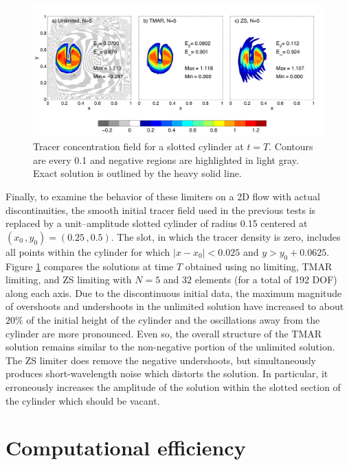 \documentclass{ametsoc}
\begin{document}
\begin{figure} 
\includegraphics[width=\textwidth]{figs/2d/defCyl_3panel.pdf}
\caption{Tracer concentration field for a slotted cylinder at $t=T$. Contours are every 0.1 and negative regions are highlighted in light gray. Exact solution is outlined by the heavy solid line.}\label{fig:2dCyl}
\end{figure}

Finally, to examine the behavior of these limiters on a 2D flow with actual discontinuities,  the smooth initial tracer field used in the previous tests is replaced by a unit--amplitude slotted cylinder of radius 0.15 centered at $(x_0\, , y_0) = (0.25\,,0.5)$.  The slot, in which the tracer density is zero, includes all points within the cylinder for which $|x-x_0| < 0.025$ and  $y > y_0 + 0.0625$.  Figure \ref{fig:2dCyl} compares the solutions at time $T$ obtained using no limiting, TMAR limiting, and ZS limiting with $N=5$ and $32$ elements (for a total of 192 DOF) along each axis. Due to the discontinuous initial data, the maximum magnitude of overshoots and undershoots in the unlimited solution have increased to about $20\%$ of the initial height of the cylinder and the oscillations away from the cylinder are more pronounced. Even so, the overall structure of the TMAR solution remains similar to the non-negative portion of the unlimited solution. The ZS limiter does remove the negative undershoots, but simultaneously produces short-wavelength noise which distorts the solution. In particular, it erroneously increases the amplitude of the solution within the slotted section of the cylinder which should be vacant.

\section{Computational efficiency} \label{sec:Efficiency}
\end{document}
